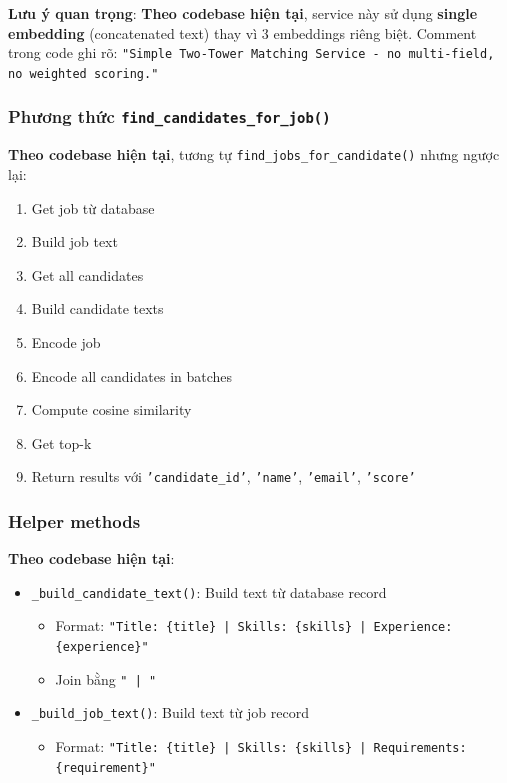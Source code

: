 \textbf{Lưu ý quan trọng}: \textbf{Theo codebase hiện tại}, service này sử dụng \textbf{single embedding} (concatenated text) thay vì 3 embeddings riêng biệt. Comment trong code ghi rõ: \texttt{"Simple Two-Tower Matching Service - no multi-field, no weighted scoring."}

\subsubsection{Phương thức \texttt{find\_candidates\_for\_job()}}

\textbf{Theo codebase hiện tại}, tương tự \texttt{find\_jobs\_for\_candidate()} nhưng ngược lại:

\begin{enumerate}
    \item Get job từ database
    \item Build job text
    \item Get all candidates
    \item Build candidate texts
    \item Encode job
    \item Encode all candidates in batches
    \item Compute cosine similarity
    \item Get top-k
    \item Return results với \texttt{'candidate\_id'}, \texttt{'name'}, \texttt{'email'}, \texttt{'score'}
\end{enumerate}

\subsubsection{Helper methods}

\textbf{Theo codebase hiện tại}:

\begin{itemize}
    \item \texttt{\_build\_candidate\_text()}: Build text từ database record
    \begin{itemize}
        \item Format: \texttt{"Title: \{title\} | Skills: \{skills\} | Experience: \{experience\}"}
        \item Join bằng \texttt{" | "}
    \end{itemize}
    \item \texttt{\_build\_job\_text()}: Build text từ job record
    \begin{itemize}
        \item Format: \texttt{"Title: \{title\} | Skills: \{skills\} | Requirements: \{requirement\}"}
    \end{itemize}
\end{itemize}

